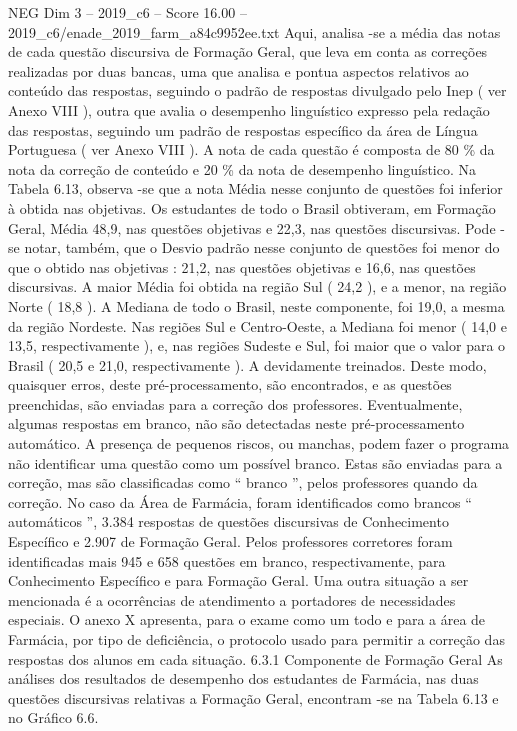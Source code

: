 \begin{textsample}{NEG Dim 3 – 2019\_c6 – Score 16.00 – 2019\_c6/enade\_2019\_farm\_a84c9952ee.txt}
Aqui, analisa -se a média das notas de cada questão discursiva de Formação Geral, que leva em conta as correções realizadas por duas bancas, uma que analisa e pontua aspectos relativos ao conteúdo das respostas, seguindo o padrão de respostas divulgado pelo Inep ( ver Anexo VIII ), outra que avalia o desempenho linguístico expresso pela redação das respostas, seguindo um padrão de respostas específico da área de Língua Portuguesa ( ver Anexo VIII ).
A nota de cada questão é composta de 80 \% da nota da correção de conteúdo e 20 \% da nota de desempenho linguístico.
Na Tabela 6.13, observa -se que a nota Média nesse conjunto de questões foi inferior à obtida nas objetivas.
Os estudantes de todo o Brasil obtiveram, em Formação Geral, Média 48,9, nas questões objetivas e 22,3, nas questões discursivas.
Pode -se notar, também, que o Desvio padrão nesse conjunto de questões foi menor do que o obtido nas objetivas : 21,2, nas questões objetivas e 16,6, nas questões discursivas.
A maior Média foi obtida na região Sul ( 24,2 ), e a menor, na região Norte ( 18,8 ).
A Mediana de todo o Brasil, neste componente, foi 19,0, a mesma da região Nordeste.
Nas regiões Sul e Centro-Oeste, a Mediana foi menor ( 14,0 e 13,5, respectivamente ), e, nas regiões Sudeste e Sul, foi maior que o valor para o Brasil ( 20,5 e 21,0, respectivamente ).
A devidamente treinados.
Deste modo, quaisquer erros, deste pré-processamento, são encontrados, e as questões preenchidas, são enviadas para a correção dos professores.
Eventualmente, algumas respostas em branco, não são detectadas neste pré-processamento automático.
A presença de pequenos riscos, ou manchas, podem fazer o programa não identificar uma questão como um possível branco.
Estas são enviadas para a correção, mas são classificadas como “ branco ”, pelos professores quando da correção.
No caso da Área de Farmácia, foram identificados como brancos “ automáticos ”, 3.384 respostas de questões discursivas de Conhecimento Específico e 2.907 de Formação Geral.
Pelos professores corretores foram identificadas mais 945 e 658 questões em branco, respectivamente, para Conhecimento Específico e para Formação Geral.
Uma outra situação a ser mencionada é a ocorrências de atendimento a portadores de necessidades especiais.
O anexo X apresenta, para o exame como um todo e para a área de Farmácia, por tipo de deficiência, o protocolo usado para permitir a correção das respostas dos alunos em cada situação. 6.3.1 Componente de Formação Geral As análises dos resultados de desempenho dos estudantes de Farmácia, nas duas questões discursivas relativas a Formação Geral, encontram -se na Tabela 6.13 e no Gráfico 6.6.

\end{textsample}
